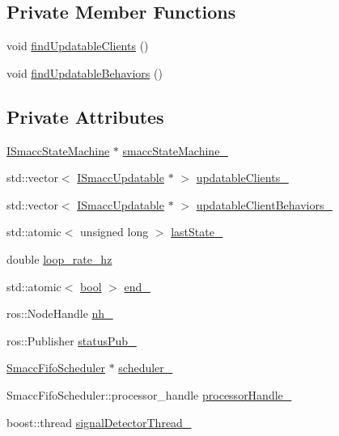 \subsection*{Private Member Functions}
\begin{DoxyCompactItemize}
\item 
void \hyperlink{classsmacc_1_1SignalDetector_a47ec2df560e2e33758ce3975bece9385}{find\+Updatable\+Clients} ()
\item 
void \hyperlink{classsmacc_1_1SignalDetector_a7e1301b9d23a522f18385368421c83f5}{find\+Updatable\+Behaviors} ()
\end{DoxyCompactItemize}
\subsection*{Private Attributes}
\begin{DoxyCompactItemize}
\item 
\hyperlink{classsmacc_1_1ISmaccStateMachine}{I\+Smacc\+State\+Machine} $\ast$ \hyperlink{classsmacc_1_1SignalDetector_a46025de6ac7b5980e22144f9703236a4}{smacc\+State\+Machine\+\_\+}
\item 
std\+::vector$<$ \hyperlink{classsmacc_1_1ISmaccUpdatable}{I\+Smacc\+Updatable} $\ast$ $>$ \hyperlink{classsmacc_1_1SignalDetector_a01a457b4ec935473d6426efb7b87e683}{updatable\+Clients\+\_\+}
\item 
std\+::vector$<$ \hyperlink{classsmacc_1_1ISmaccUpdatable}{I\+Smacc\+Updatable} $\ast$ $>$ \hyperlink{classsmacc_1_1SignalDetector_a9dce129da8c8a9971416a8f498132c23}{updatable\+Client\+Behaviors\+\_\+}
\item 
std\+::atomic$<$ unsigned long $>$ \hyperlink{classsmacc_1_1SignalDetector_a72293ed0e98f4200fbe75b53f1e41eab}{last\+State\+\_\+}
\item 
double \hyperlink{classsmacc_1_1SignalDetector_a41a2ae4262ed350f46d8b886bdc1dfa5}{loop\+\_\+rate\+\_\+hz}
\item 
std\+::atomic$<$ \hyperlink{classbool}{bool} $>$ \hyperlink{classsmacc_1_1SignalDetector_aaee266393c01693528a2d74b1f2354a2}{end\+\_\+}
\item 
ros\+::\+Node\+Handle \hyperlink{classsmacc_1_1SignalDetector_a5c416677fd537afc79f2fbc2e68b2dee}{nh\+\_\+}
\item 
ros\+::\+Publisher \hyperlink{classsmacc_1_1SignalDetector_ae065bbd4e699e5fce00fbc508dedd4c1}{status\+Pub\+\_\+}
\item 
\hyperlink{smacc__fifo__scheduler_8h_a0063e275231c80d5f97df21d17257bf7}{Smacc\+Fifo\+Scheduler} $\ast$ \hyperlink{classsmacc_1_1SignalDetector_adaee5b9b91d0e6305dc1ab30f7ab566d}{scheduler\+\_\+}
\item 
Smacc\+Fifo\+Scheduler\+::processor\+\_\+handle \hyperlink{classsmacc_1_1SignalDetector_a9a77dc9f0e9f8f56dff5e76077abcb78}{processor\+Handle\+\_\+}
\item 
boost\+::thread \hyperlink{classsmacc_1_1SignalDetector_a4346a400cd37eafc5d1d2e63d975785e}{signal\+Detector\+Thread\+\_\+}
\end{DoxyCompactItemize}


